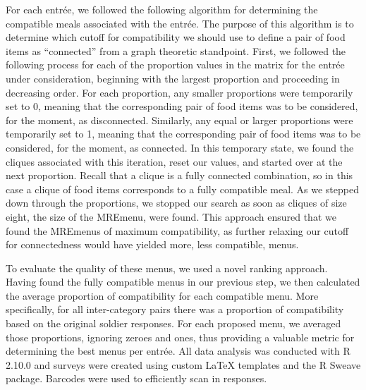 For each entr\'{e}e, we followed the following algorithm for determining the compatible meals associated with the entr\'{e}e.  The purpose of this algorithm is to determine which cutoff for compatibility we should use to define a pair of food items as “connected” from a graph theoretic standpoint.  First, we followed the following process for each of the proportion values in the matrix for the entr\'{e}e under consideration, beginning with the largest proportion and proceeding in decreasing order.  For each proportion, any smaller proportions were temporarily set to 0, meaning that the corresponding pair of food items was to be considered, for the moment, as disconnected.  Similarly, any equal or larger proportions were temporarily set to 1, meaning that the corresponding pair of food items was to be considered, for the moment, as connected.  In this temporary state, we found the cliques associated with this iteration, reset our values, and started over at the next proportion.  Recall that a clique is a fully connected combination, so in this case a clique of food items corresponds to a fully compatible meal.  As we stepped down through the proportions, we stopped our search as soon as cliques of size eight, the size of the MRE\tm menu, were found.  This approach ensured that we found the MRE\tm menus of maximum compatibility, as further relaxing our cutoff for connectedness would have yielded more, less compatible, menus.  

To evaluate the quality of these menus, we used a novel ranking approach.  Having found the fully compatible menus in our previous step, we then calculated the average proportion of compatibility for each compatible menu.  More specifically, for all inter-category pairs there was a proportion of compatibility based on the original soldier responses.  For each proposed menu, we averaged those proportions, ignoring zeroes and ones, thus providing a valuable metric for determining the best menus per entr\'{e}e.  All data analysis was conducted with R 2.10.0 and surveys were created using custom LaTeX templates and the R Sweave package.  Barcodes were used to efficiently scan in responses.

